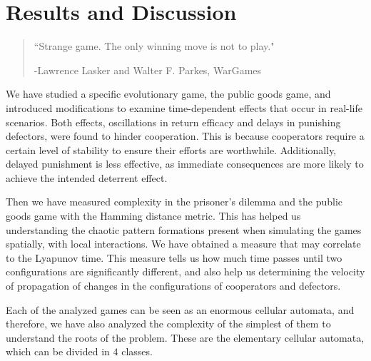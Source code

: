 \chapter{Results and Discussion}
\label{chap:Discussion}



\begin{quotation}
	\vspace{-3cm}
    \begin{flushright}
    \begin{minipage}[t][5cm][b]{0.5\textwidth}
    { ``Strange game. The only winning move is not to play."}
    
    \bigskip
    
    -{\small  Lawrence Lasker and Walter F. Parkes, WarGames}
    \end{minipage}
    \end{flushright}
    
    \vspace{0.5cm}
\end{quotation}




We have studied a specific evolutionary game, the public goods game, and introduced modifications to examine time-dependent effects that occur in real-life scenarios. Both effects, oscillations in return efficacy and delays in punishing defectors, were found to hinder cooperation. This is because cooperators require a certain level of stability to ensure their efforts are worthwhile. Additionally, delayed punishment is less effective, as immediate consequences are more likely to achieve the intended deterrent effect.

Then we have measured complexity in the prisoner's dilemma and the public goods game with the Hamming distance metric. This has helped us understanding the chaotic pattern formations present when simulating the games spatially, with local interactions. We have obtained a measure that may correlate to the Lyapunov time. This measure tells us how much time passes until two configurations are significantly different, and also help us determining the velocity of propagation of changes in the configurations of cooperators and defectors.

Each of the analyzed games can be seen as an enormous cellular automata, and therefore, we have also analyzed the complexity of the simplest of them to understand the roots of the problem. These are the elementary cellular automata, which can be divided in $4$ classes. 

